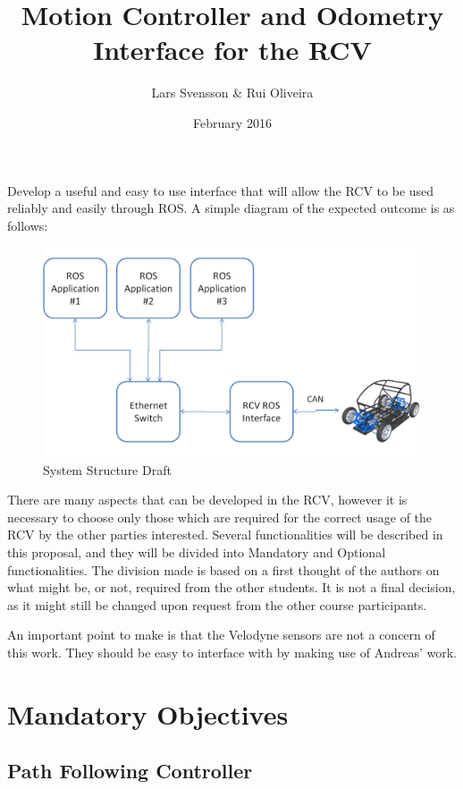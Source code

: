 \documentclass{article}
\title{Motion Controller and Odometry Interface for the RCV}
\author{Lars Svensson \& Rui Oliveira}
\date{February 2016}
\begin{document}
  
  
\maketitle

Develop a useful and easy to use interface that will allow the RCV to be used reliably and easily through ROS. A simple diagram of the expected outcome is as follows:


\begin{figure}[h!]
\centering
\includegraphics[width=1.0\textwidth]{systemStructure2.png}
\caption{System Structure Draft}
\label{fig:systemStructure}
\end{figure} 


There are many aspects that can be developed in the RCV, however it is necessary to choose only those which are required for the correct usage of the RCV by the other parties interested. Several functionalities will be described in this proposal, and they will be divided into Mandatory and Optional functionalities. The division made is based on a first thought of the authors on what might be, or not, required from the other students. It is not a final decision, as it might still be changed upon request from the other course participants.

An important point to make is that the Velodyne sensors are not a concern of this work. They should be easy to interface with by making use of Andreas' work.

\section{Mandatory Objectives}

\subsection{Path Following Controller}
\end{document}
